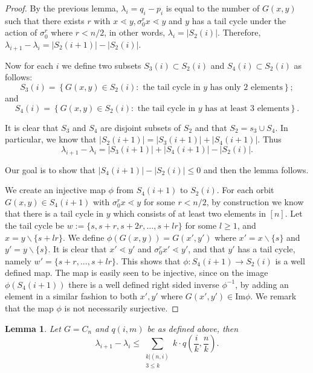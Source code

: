 \documentclass[10 pt]{amsart}
\theoremstyle{plain}
\newtheorem{lem}[thm]{Lemma}
\theoremstyle{definition}
\theoremstyle{remark}
\numberwithin{equation}{section}
\newcommand{\minus}{\backslash}
\newcommand\im{\text{Im}}
\begin{document}
\begin{proof}

By the previous lemma, $\lambda_i = q_i - p_i$ is equal to the number of $G(x, y)$ such that there exists $r$ with $x\lessdot y,\sigma_0^r x \lessdot y$ and $y$ has a tail cycle under the action of $\sigma_0^r$ where $r < n/2$, in other words, $\lambda_i = |S_2(i)|.$ Therefore, $\lambda_{i+1} - \lambda_i = |S_2(i+1)| - |S_2(i)|$. 

Now for each $i$ we define two subsets $S_3(i) \subset S_2(i)$ and $S_4(i) \subset S_2(i)$ as follows: 
$$S_3 (i) = \left\{ G(x, y) \in S_2(i) : \text{ the tail cycle in } y \text{ has only } 2 \text{ elements}\right\};$$ and $$S_4(i)= \left\{ G(x, y) \in S_2(i) : \text{ the tail cycle in } y \text{ has at least } 3\text{ elements}\right\}.$$  

It is clear that $S_3$ and $S_4$ are disjoint subsets of $S_2$ and that $S_2 = s_3 \cup S_4$. In particular, we know that $|S_2(i+1)| = |S_3(i+1)| +|S_4(i+1)|.$ Thus $$\lambda_{i+1} - \lambda_i = |S_3(i+1)| + |S_4(i+1)| - |S_2(i)|.$$

Our goal is to show that $|S_4(i+1) | - |S_2(i)| \le 0$ and then the lemma follows.

We create an injective map $\phi$ from $S_4(i+1)$ to $S_2(i)$. For each orbit $G(x, y) \in S_4(i+1)$ with $\sigma_0^r x \lessdot y $ for some $r < n/2$, by construction we know that there is a tail cycle in $y$ which consists of at least two elements in $[n]$. Let the tail cycle be $w := \{s,s+r,s+2r,\ldots,s+lr\}$  for some $l \ge 1$, and $x = y \minus \{s+lr\} $. We define $\phi(G(x, y)) = G(x', y')$ where $x' = x \minus \{s\}$ and $y' = y \minus \{s\}$. It is clear that $x' \lessdot y'$ and $\sigma_0^r x' \lessdot y'$, and that $y'$ has a tail cycle, namely $w' = \{s+r, ..., s+lr\}$. This shows that $\phi: S_4(i+1) \rightarrow S_2(i)$ is a well defined map. The map is easily seen to be injective, since on the image $\phi(S_4(i+1))$ there is a well defined right sided inverse $\phi^{-1}$, by adding an element in a similar fashion to both $x', y'$ where $G(x', y') \in \im \phi$. We remark that the map $\phi$ is not necessarily surjective. 
\end{proof}

\begin{lem}{\label{lem:cyclic_bounding_lambda}} 
Let $G =C_n$ and $q(i,m)$ be as defined above,  then $$\lambda_{i+1} - \lambda_i \le \sum_{\substack{k | (n , i) \\ 3 \le k }} k \cdot q \left(\frac{i}{k},\frac{n}{k}\right) .$$ 
\end{lem}
\end{document}
